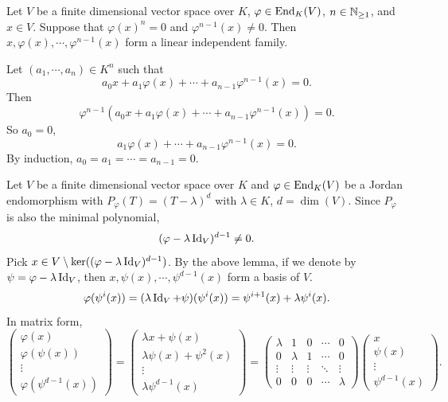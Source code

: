 \begin{lemmaenv}
    Let $V$ be a finite dimensional vector space over $K$,
    $\varphi \in \operatorname{\mathrm{End}}_{K}(V)$, $n \in \mathbb{N}_{\ge 1}$, and $x \in V$.
    Suppose that $\varphi(x)^n = 0$ and $\varphi^{n-1}(x) \neq 0$.
    Then $x,\varphi(x), \cdots , \varphi^{n-1}(x)$ form a linear independent family.
\end{lemmaenv}

\begin{proofenv}
    Let $(a_1,\cdots,a_n) \in K^n$ such that
    $$a_0 x +a_1 \varphi(x) + \cdots + a_{n-1}\varphi^{n-1}(x) = 0.$$
    Then
    $$\varphi^{n-1}\left(a_0 x +a_1 \varphi(x) + \cdots + a_{n-1}\varphi^{n-1}(x)\right) = 0.$$
    So $a_0 = 0$,
    $$a_1 \varphi(x) + \cdots + a_{n-1}\varphi^{n-1}(x) = 0.$$
    By induction, $a_0 = a_1 = \cdots = a_{n-1} = 0$.
\end{proofenv}

\begin{remark}
    Let $V$ be a finite dimensional vector space over $K$ and $\varphi \in \operatorname{\mathrm{End}}_{K}(V)$ be a Jordan endomorphism with $P_{\varphi}(T) = (T - \lambda)^d$ with $\lambda \in K$, $d = \dim(V)$.
    Since $P_{\varphi}$ is also the minimal polynomial,
    $$(\varphi - \lambda \operatorname{\mathrm{Id}}_{V})^{d - 1} \neq 0.$$
    Pick $x \in V \setminus \ker((\varphi - \lambda \operatorname{\mathrm{Id}}_{V})^{d - 1})$.
    By the above lemma, if we denote by $\psi = \varphi - \lambda \operatorname{\mathrm{Id}}_{V}$,
    then $x,\psi(x),\cdots,\psi^{d-1}(x)$ form a basis of $V$.
    $$\varphi(\psi^i(x)) = (\lambda\operatorname{\mathrm{Id}}_{V} + \psi)(\psi^i(x)) = \psi^{i+1}(x) + \lambda \psi^i(x).$$
    In matrix form,
    $$\begin{pmatrix}
        \varphi(x)\\
        \varphi(\psi(x))\\
        \vdots\\
        \varphi(\psi^{d-1}(x))
    \end{pmatrix} = 
    \begin{pmatrix}
        \lambda x + \psi(x)\\
        \lambda \psi(x) + \psi^2(x)\\
        \vdots\\
        \lambda \psi^{d-1}(x)
    \end{pmatrix}
    =
    \begin{pmatrix}
        \lambda & 1 & 0 & \cdots & 0\\
        0 & \lambda & 1 & \cdots & 0\\
        \vdots & \vdots & \vdots & \ddots & \vdots\\
        0 & 0 & 0 & \cdots & \lambda
    \end{pmatrix}
    \begin{pmatrix}
        x\\
        \psi(x)\\
        \vdots\\
        \psi^{d-1}(x)
    \end{pmatrix}.$$
\end{remark}


